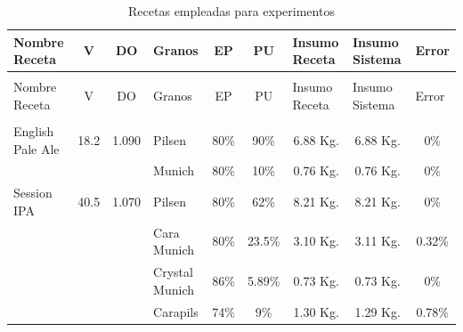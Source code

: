 \begin{longtable}{
|p{1.8cm} %
|p{0.9cm} %
|p{0.9cm} %
|p{1.8cm} %
|p{1.0cm} %
|p{1.0cm} %
|p{1.7cm} %
|p{1.7cm} %
|p{1.0cm} %
|}
    \hline
    Nombre Receta 
    & \multicolumn{1}{c|}{V}
    & \multicolumn{1}{c|}{DO}
    & Granos
    & \multicolumn{1}{c|}{EP} 
    & \multicolumn{1}{c|}{PU} 
    & Insumo Receta
    & Insumo Sistema
    & Error \\
    \hline
    \hline
    \endfirsthead
    
    \hline
    \endfoot
    
    \hline
    \multicolumn{9}{|c|}{Continuación de la Tabla \ref{tab:TablaRecetaExperimentos}}\\
    \hline
    Nombre Receta 
    & \multicolumn{1}{c|}{V}
    & \multicolumn{1}{c|}{DO}
    & Granos 
    & \multicolumn{1}{c|}{EP} 
    & \multicolumn{1}{c|}{PU} 
    & Insumo Receta 
    & Insumo Sistema
    & Error \\
    \hline
    \hline
    \endhead
    
    \hline
    \caption{Recetas empleadas para experimentos \label{tab:TablaRecetaExperimentos}}\\
    \endlastfoot
    
    English Pale Ale
    &18.2
    &1.090
    &Pilsen 
    & \multicolumn{1}{c|}{80\%}
    &\multicolumn{1}{c|}{90\%} 
    &\multicolumn{1}{c|}{6.88 Kg.} 
    &\multicolumn{1}{c|}{6.88 Kg.} 
    & \multicolumn{1}{c|}{0\%}
    \\
    &  
    &  
    & Munich
    & \multicolumn{1}{c|}{80\%}
    & \multicolumn{1}{c|}{10\%}
    &\multicolumn{1}{c|}{0.76 Kg.} &\multicolumn{1}{c|}{0.76 Kg.} 
    & \multicolumn{1}{c|}{0\%}
    \\
    \hline

    Session IPA
    &40.5
    &1.070
    & Pilsen
    &\multicolumn{1}{c|}{80\%}
    &\multicolumn{1}{c|}{62\%} 
    & \multicolumn{1}{c|}{8.21 Kg.} 
    & \multicolumn{1}{c|}{8.21 Kg.} 
    & \multicolumn{1}{c|}{0\%}
    \\
    & 
    &  
    & Cara Munich 
    &\multicolumn{1}{c|}{80\%}
    &\multicolumn{1}{c|}{23.5\%}
    &\multicolumn{1}{c|}{3.10 Kg.} 
    &\multicolumn{1}{c|}{3.11 Kg.} 
    & \multicolumn{1}{c|}{0.32\%}
    \\
    &  
    &  
    & Crystal Munich
    &\multicolumn{1}{c|}{86\%}
    &\multicolumn{1}{c|}{5.89\%}
    &\multicolumn{1}{c|}{0.73 Kg.} 
    &\multicolumn{1}{c|}{0.73 Kg.} 
    & \multicolumn{1}{c|}{0\%}
    \\
    & 
    &  
    & Carapils 
    &\multicolumn{1}{c|}{74\%}
    & \multicolumn{1}{c|}{9\%}
    &\multicolumn{1}{c|}{1.30 Kg.} 
    &\multicolumn{1}{c|}{1.29 Kg.} 
    & \multicolumn{1}{c|}{0.78\%}
    \\
    \hline
    

\end{longtable}
